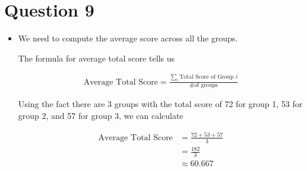 \documentclass[12pt]{article}
\begin{document}
\section*{Question 9}

\bigskip

\begin{itemize}
    \item

    We need to compute the average score across all the groups.

    \bigskip

    The formula for average total score tells us

    \setcounter{equation}{0}
    \begin{align}
        \text{Average Total Score} = \frac{\sum\limits_{i} \text{Total Score of Group } i}{\text{\# of groups}}
    \end{align}

    \bigskip

    Using the fact there are 3 groups with the total score of 72 for group 1,
    53 for group 2, and 57 for group 3, we can calculate

    \begin{align}
        \text{Average Total Score} &= \frac{72 + 53 + 57}{3}\\
        &= \frac{182}{3}\\
        &\approx 60.667
    \end{align}
\end{itemize}

\bigskip
\end{document}
